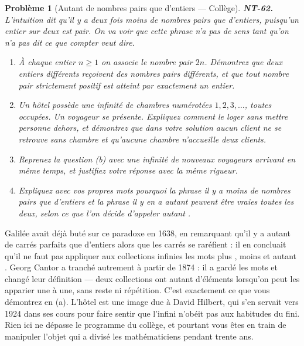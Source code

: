 \documentclass[11pt]{article}
\newtheorem{problem}{Problème}
\begin{document}
\bigskip

\begin{problem}[{Autant de nombres pairs que d'entiers --- Collège}]
\textbf{NT-62.} L'intuition dit qu'il y a \og{} deux fois moins \fg{} de nombres pairs que d'entiers,
puisqu'un entier sur deux est pair. On va voir que cette phrase n'a pas de sens tant qu'on n'a pas
dit ce que compter veut dire.
\begin{enumerate}
\item[(a)] À chaque entier $ n \ge 1 $ on associe le nombre pair $ 2n $. Démontrez que deux entiers
différents reçoivent des nombres pairs différents, et que tout nombre pair strictement positif est
atteint par exactement un entier.
\item[(b)] Un hôtel possède une infinité de chambres numérotées $ 1, 2, 3, \ldots $, toutes occupées. Un
voyageur se présente. Expliquez comment le loger sans mettre personne dehors, et démontrez que dans
votre solution aucun client ne se retrouve sans chambre et qu'aucune chambre n'accueille deux
clients.
\item[(c)] Reprenez la question (b) avec une infinité de nouveaux voyageurs arrivant en même temps, et
justifiez votre réponse avec la même rigueur.
\item[(d)] Expliquez avec vos propres mots pourquoi la phrase \og{} il y a moins de nombres pairs que d'entiers \fg{}
et la phrase \og{} il y en a autant \fg{} peuvent être vraies toutes les deux, selon ce que l'on décide
d'appeler \og{} autant \fg{}.
\end{enumerate}

\end{problem}

\noindent Galilée avait déjà buté sur ce paradoxe en 1638, en remarquant qu'il y a autant de
carrés parfaits que d'entiers alors que les carrés se raréfient : il en concluait qu'il ne faut pas
appliquer aux collections infinies les mots \og{} plus \fg{}, \og{} moins \fg{} et \og{} autant \fg{}. Georg Cantor a tranché
autrement à partir de 1874 : il a gardé les mots et changé leur définition --- deux collections ont
autant d'éléments lorsqu'on peut les apparier une à une, sans reste ni répétition. C'est exactement ce
que vous démontrez en (a). L'hôtel est une image due à David Hilbert, qui s'en servait vers 1924 dans
ses cours pour faire sentir que l'infini n'obéit pas aux habitudes du fini. Rien ici ne dépasse le
programme du collège, et pourtant vous êtes en train de manipuler l'objet qui a divisé les
mathématiciens pendant trente ans.
\end{document}

